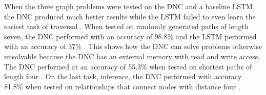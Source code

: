 When the three graph problems were tested on the DNC and a baseline LSTM, the
DNC produced much better results while the LSTM failed to even learn the
easiest task of traversal \cite{graves2016hybrid}. When tested on randomly
generated paths of length seven, the DNC performed with an accuracy of 98.8\%
and the LSTM performed with an accuracy of 37\% \cite{graves2016hybrid}. This
shows how the DNC can solve problems otherwise unsolvable because the DNC has
an external memory with read and write access. The DNC performed at an accuracy
of 55.3\% when tested on shortest paths of length four \cite{graves2016hybrid}.
On the last task, inference, the DNC performed with accuracy 81.8\% when tested
on relationships that connect nodes with distance four \cite{graves2016hybrid}.
